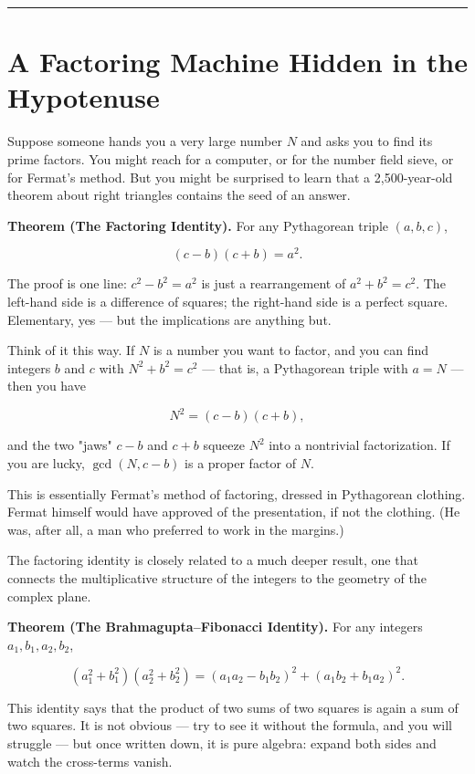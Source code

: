 \documentclass[12pt, letterpaper, openany]{book}
\theoremstyle{definition}
\theoremstyle{remark}
\begin{document}
\bigskip\noindent\rule{\textwidth}{0.4pt}\bigskip



\section*{A Factoring Machine Hidden in the Hypotenuse}


Suppose someone hands you a very large number $N$ and asks you to find its prime factors. You might reach for a computer, or for the number field sieve, or for Fermat's method. But you might be surprised to learn that a 2,500-year-old theorem about right triangles contains the seed of an answer.

\textbf{Theorem (The Factoring Identity).} For any Pythagorean triple $(a, b, c)$,

\[
(c - b)(c + b) = a^2.
\]

The proof is one line: $c^2 - b^2 = a^2$ is just a rearrangement of $a^2 + b^2 = c^2$. The left-hand side is a difference of squares; the right-hand side is a perfect square. Elementary, yes --- but the implications are anything but.

Think of it this way. If $N$ is a number you want to factor, and you can find integers $b$ and $c$ with $N^2 + b^2 = c^2$ --- that is, a Pythagorean triple with $a = N$ --- then you have

\[
N^2 = (c - b)(c + b),
\]

and the two "jaws" $c - b$ and $c + b$ squeeze $N^2$ into a nontrivial factorization. If you are lucky, $\gcd(N, c - b)$ is a proper factor of $N$.

This is essentially Fermat's method of factoring, dressed in Pythagorean clothing. Fermat himself would have approved of the presentation, if not the clothing. (He was, after all, a man who preferred to work in the margins.)

The factoring identity is closely related to a much deeper result, one that connects the multiplicative structure of the integers to the geometry of the complex plane.

\textbf{Theorem (The Brahmagupta--Fibonacci Identity).} For any integers $a_1, b_1, a_2, b_2$,

\[
(a_1^2 + b_1^2)(a_2^2 + b_2^2) = (a_1 a_2 - b_1 b_2)^2 + (a_1 b_2 + b_1 a_2)^2.
\]

This identity says that the product of two sums of two squares is again a sum of two squares. It is not obvious --- try to see it without the formula, and you will struggle --- but once written down, it is pure algebra: expand both sides and watch the cross-terms vanish.
\end{document}

